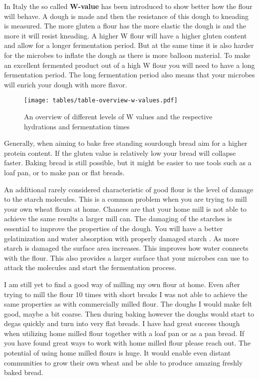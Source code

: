In Italy the so called
\textbf{W-value} has been introduced to show better how the flour will behave.
A dough is made and then the resistance of this dough to kneading is measured.
The more gluten a flour has the more elastic the dough is and the more it will
resist kneading. A higher W flour will have a higher gluten content and allow for a longer
fermentation period. But at the same time it is also harder for the microbes to
inflate the dough as there is more balloon material. To make an excellent fermented
product out of a high W flour you will need to have a long fermentation period.
The long fermentation period also means that your microbes will enrich
your dough with more flavor.

\begin{figure}[!htb]
  \texttt{[image: tables/table-overview-w-values.pdf]}
  \caption{An overview of different levels of W values and the respective hydrations and fermentation times}
  \label{tab:w-value}
\end{figure}

Generally, when aiming to
bake free standing sourdough bread aim for a higher protein content. If the
gluten value is relatively low your bread will collapse faster. Baking bread
is still possible, but it might be easier to use tools such as a loaf pan, or
to make pan or flat breads.

An additional rarely considered characteristic of good flour is the level of damage to the
starch molecules. This is a common problem when you are trying to mill your own wheat flours at
home. Chances are that your home mill is not able to achieve the same results
a larger mill can. The damaging of the starches is essential to improve the
properties of the dough. You will have a better gelatinization and water
absorption with properly damaged starch \cite{starch+damage+flour}. As more
starch is damaged the surface area increases. This improves how water connects with the flour.
This also provides a larger surface that your microbes can use to attack the molecules 
and start the fermentation process.

I am still
yet to find a good way of milling my own flour at home. Even after trying to
mill the flour 10 times with short breaks I was not able to achieve the same
properties as with commercially milled flour. The doughs I would make felt
good, maybe a bit coarse. Then during baking however the doughs would start to
degas quickly and turn into very flat breads. I have had great success though when
utilizing home milled flour together with a loaf pan or as a pan bread. If you
have found great ways to work with home milled flour please reach out. The potential
of using home milled flours is huge. It would enable even distant communities
to grow their own wheat and be able to produce amazing freshly baked bread.